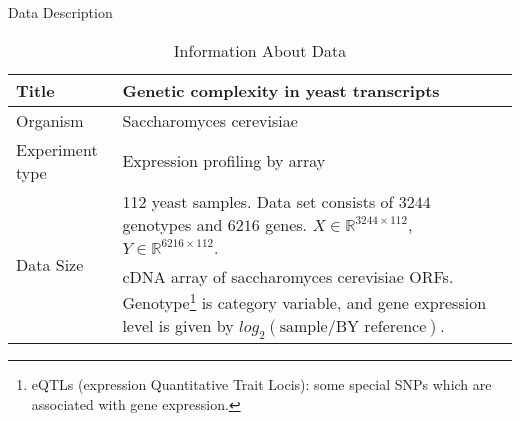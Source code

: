 \begin{frame}{Data Description}
\begin{table}[h]
        \centering

        \begin{tabular}{|l|p{7cm}|}
            \hline
            Title                           &   Genetic complexity in yeast transcripts \\ \hline
            Organism                        &   Saccharomyces cerevisiae                \\ \hline
            Experiment type                 &   Expression profiling by array           \\ \hline
            \multirow{3}{*}{Data Size}      &   112 yeast samples. Data set consists of $3244$ genotypes and $6216$ genes.  $X \in \mathbb{R}^{3244\times112}$, $Y \in \mathbb{R}^{6216\times112}$. \\ \hline
           \multirow{3}{*}{Description}     &   cDNA array of saccharomyces cerevisiae ORFs. Genotype\footnote[1]{eQTLs (expression Quantitative Trait Locis): some special SNPs which are associated with gene expression. } is category variable, and gene expression level is given by  $log_2(\text{sample} / \text{BY reference})$. \\ \hline
        \end{tabular}
        \caption{Information About Data}
    \end{table}
\end{frame}

    

      

